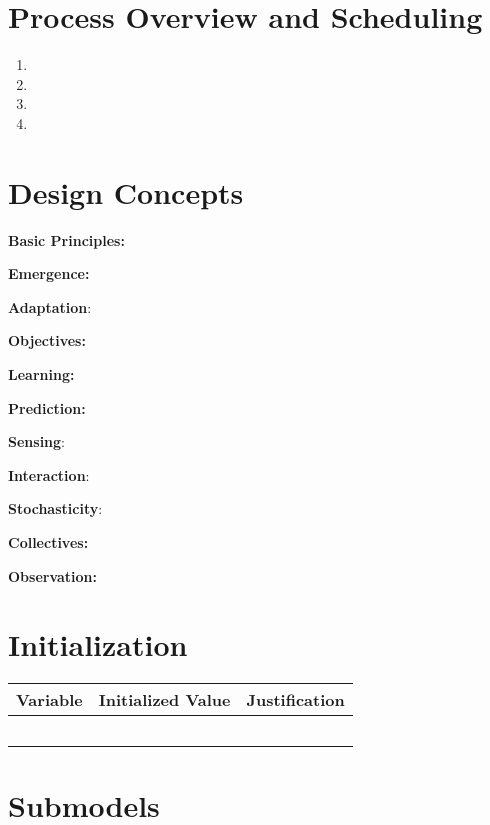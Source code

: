 \documentclass[
]{book}
\providecommand{\tightlist}{%
  \setlength{\itemsep}{0pt}\setlength{\parskip}{0pt}}
\begin{document}
\section{Process Overview and Scheduling}\label{process-overview-and-scheduling-11}

\begin{enumerate}
\def\labelenumi{\arabic{enumi}.}
\tightlist
\item
\item
\item
\item
\end{enumerate}

\section{Design Concepts}\label{design-concepts-11}

\textbf{Basic Principles:}

\textbf{Emergence:}

\textbf{Adaptation}:

\textbf{Objectives:}

\textbf{Learning:}

\textbf{Prediction:}

\textbf{Sensing}:

\textbf{Interaction}:

\textbf{Stochasticity}:

\textbf{Collectives:}

\textbf{Observation:}

\section{Initialization}\label{initialization-11}

\begin{longtable}[]{@{}ccc@{}}
\toprule\noalign{}
Variable & Initialized Value & Justification \\
\midrule\noalign{}
\endhead
\bottomrule\noalign{}
\endlastfoot
& & \\
& & \\
& & \\
& & \\
& & \\
\end{longtable}

\section{Submodels}\label{submodels-11}


\end{document}
